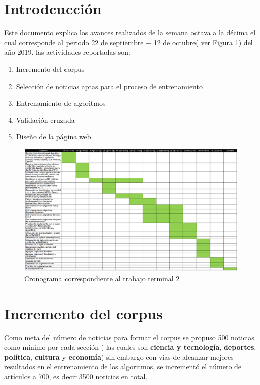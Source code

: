 \section{Introdcucción}

Este documento explica los avances realizados de la semana octava a  la décima el cual corresponde al periodo 22 de septiembre $-$ 12 de octubre( ver Figura \ref{fig:cronograma}) del año 2019. las actividades reportadas son:

\begin{enumerate}
	\item Incremento del corpus
	\item Selección de noticias aptas para el proceso de entrenamiento	
	\item Entrenamiento de algoritmos
	\item Validación cruzada
	\item Diseño de la página web
\end{enumerate} 

\begin{figure}[ht]
\centering
\includegraphics[scale=0.4]{imagenes/Cronograma.png}
\caption{Cronograma correspondiente al trabajo terminal 2}
\label{fig:cronograma}
\end{figure}

\section{Incremento del corpus}

Como meta del número de noticias para formar el corpus se propuso 500 noticias como mínimo por cada sección ( las cuales son \textbf{ciencia y tecnología}, \textbf{deportes}, \textbf{política}, \textbf{cultura} y \textbf{economía}) sin embargo con vías de alcanzar mejores resultados en el entrenamiento de los algoritmos, se incrementó el número de artículos a 700, es decir 3500 noticias en total.\\

